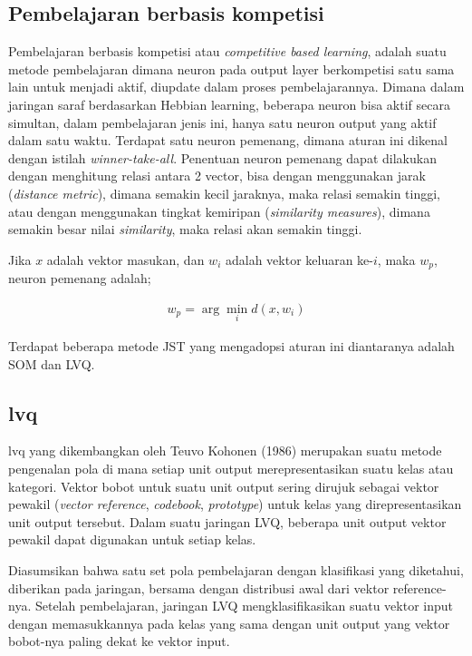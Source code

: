 \subsection{Pembelajaran berbasis kompetisi}
Pembelajaran berbasis kompetisi atau \textit{competitive based learning}, adalah
suatu metode pembelajaran dimana neuron pada output layer berkompetisi satu sama lain
untuk menjadi aktif, diupdate dalam proses pembelajarannya. Dimana
dalam jaringan saraf berdasarkan Hebbian learning, beberapa neuron bisa aktif
secara simultan, dalam pembelajaran jenis ini, hanya satu neuron output yang
aktif dalam satu waktu. Terdapat satu neuron pemenang, dimana aturan ini dikenal
dengan istilah \textit{winner-take-all}. Penentuan neuron pemenang dapat
dilakukan dengan menghitung relasi antara 2 vector, bisa
dengan menggunakan jarak (\textit{distance metric}), dimana semakin kecil
jaraknya, maka relasi semakin tinggi, atau dengan menggunakan tingkat
kemiripan (\textit{similarity measures}), dimana semakin besar nilai
\textit{similarity}, maka relasi akan semakin tinggi. 

Jika $x$ adalah vektor masukan, dan  $w_i$ adalah vektor keluaran ke-$i$, maka
$w_p$, neuron pemenang adalah;

\begin{align}
\label{eq:lvqwin}
	w_p = \arg \min_i d(x, w_i)
\end{align}

Terdapat beberapa metode JST yang mengadopsi aturan ini diantaranya adalah SOM
dan LVQ.

\subsection{\Gls{lvq}}

\Gls{lvq} yang dikembangkan oleh Teuvo Kohonen (1986) \cite{Kohonen-1986b}
merupakan suatu metode pengenalan pola di mana setiap unit output
merepresentasikan suatu kelas atau kategori. Vektor bobot untuk suatu unit
output sering dirujuk sebagai vektor pewakil (\textit{vector reference},
\textit{codebook}, \textit{prototype}) untuk kelas yang direpresentasikan unit
output tersebut. Dalam suatu jaringan LVQ, beberapa unit output vektor pewakil
dapat digunakan untuk setiap kelas. 

Diasumsikan bahwa satu set pola pembelajaran dengan klasifikasi yang diketahui,
diberikan pada jaringan, bersama dengan distribusi awal dari vektor
reference-nya. Setelah pembelajaran, jaringan LVQ mengklasifikasikan suatu
vektor input dengan memasukkannya pada kelas yang sama dengan unit output yang
vektor bobot-nya paling dekat ke vektor input.

